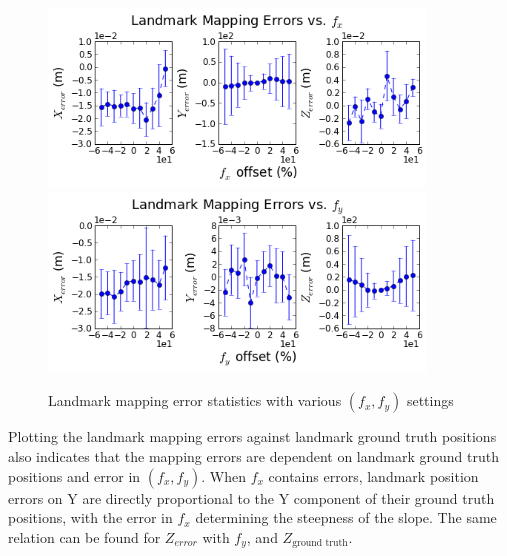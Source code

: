 \begin{figure}[h]%
  \centering
  \includegraphics[width=10cm,keepaspectratio=true]{./Figures/SimulationFigures/Figure38.png}
  \includegraphics[width=10cm,keepaspectratio=true]{./Figures/SimulationFigures/Figure39.png}
  \caption{Landmark mapping error statistics with various $(f_x, f_y)$
  settings}
  \label{fig:simfig38-39}
\end{figure}

Plotting the landmark mapping errors against landmark ground truth
positions also indicates that the mapping errors are dependent on
landmark ground truth positions and error in $(f_x, f_y)$. When $f_x$
contains errors, landmark position errors on Y are directly
proportional to the Y component of their ground truth positions, with the
error in $f_x$ determining the steepness of the slope. The same relation can be
found for $Z_{error}$ with $f_y$, and $Z_{\text{ground truth}}$.

